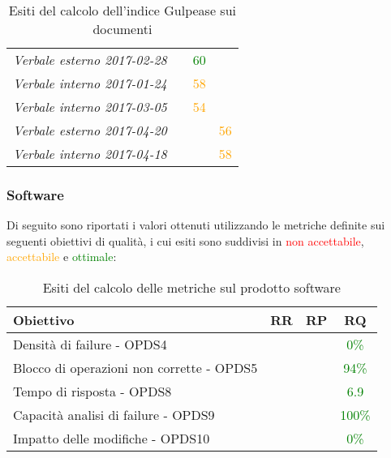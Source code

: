 \documentclass[PdQ.tex]{subfiles}
\begin{document}
\begin{table}[h]
\begin{tabular}{l c c c}
					\textit{Verbale esterno 2017-02-28} & & \textcolor{green}{60} & \\
					\rule[0cm]{0cm}{0.4cm}
					\textit{Verbale interno 2017-01-24} & & \textcolor{orange}{58} & \\
					\rule[0cm]{0cm}{0.4cm}
					\textit{Verbale interno 2017-03-05} & & \textcolor{orange}{54} & \\
					\rule[0cm]{0cm}{0.4cm}
					\textit{Verbale esterno 2017-04-20} & & & \textcolor{orange}{56}\\
					\rule[0cm]{0cm}{0.4cm}
					\textit{Verbale interno 2017-04-18} & & & \textcolor{orange}{58}\\
					\hline
				\end{tabular}
				\caption{Esiti del calcolo dell'indice Gulpease sui documenti}
			\end{table}
	\subsubsection{Software}
	Di seguito sono riportati i valori ottenuti utilizzando le metriche definite sui seguenti obiettivi di qualità, i cui esiti sono suddivisi in \textcolor{red}{non accettabile}, \textcolor{orange}{accettabile} e \textcolor{green}{ottimale}:
	\begin{table}[h]
				\centering
				\begin{tabular}{l c c c}
					\hline
					\rule[-0.3cm]{0cm}{0.8cm}
					\textbf{Obiettivo} & \textbf{RR} & \textbf{RP} & \textbf{RQ}\\
					\hline
					\rule[0cm]{0cm}{0.4cm}
					Densità di failure - OPDS4 & & & \textcolor{green}{0\%} \\
					\rule[0cm]{0cm}{0.4cm}
					Blocco di operazioni non corrette - OPDS5 & & & \textcolor{green}{94\%} \\
					\rule[0cm]{0cm}{0.4cm}
					Tempo di risposta - OPDS8 & & & \textcolor{green}{6.9} \\
					\rule[0cm]{0cm}{0.4cm}
					Capacità analisi di failure - OPDS9 & & & \textcolor{green}{100\%} \\
					\rule[0cm]{0cm}{0.4cm}
					Impatto delle modifiche - OPDS10 & & & \textcolor{green}{0\%} \\
					\hline
				\end{tabular}
				\caption{Esiti del calcolo delle metriche sul prodotto software}
			\end{table}
\end{document}

